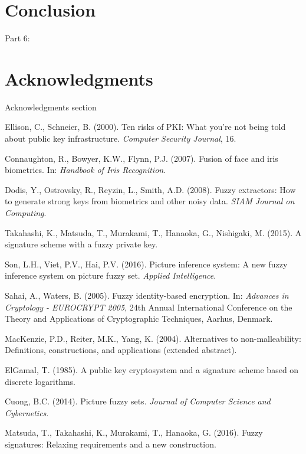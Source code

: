\documentclass[graybox]{svmult}
\begin{document}
\section{Conclusion}
Part 6:


\section*{Acknowledgments}
Acknowledgments section


\begin{thebibliography}{99}
     Ellison, C., Schneier, B. (2000). Ten risks of PKI: What you're not being told about public key infrastructure. \textit{Computer Security Journal}, 16.

     Connaughton, R., Bowyer, K.W., Flynn, P.J. (2007). Fusion of face and iris biometrics. In: \textit{Handbook of Iris Recognition}.

     Dodis, Y., Ostrovsky, R., Reyzin, L., Smith, A.D. (2008). Fuzzy extractors: How to generate strong keys from biometrics and other noisy data. \textit{SIAM Journal on Computing}.

     Takahashi, K., Matsuda, T., Murakami, T., Hanaoka, G., Nishigaki, M. (2015). A signature scheme with a fuzzy private key.

     Son, L.H., Viet, P.V., Hai, P.V. (2016). Picture inference system: A new fuzzy inference system on picture fuzzy set. \textit{Applied Intelligence}.

     Sahai, A., Waters, B. (2005). Fuzzy identity-based encryption. In: \textit{Advances in Cryptology - EUROCRYPT 2005}, 24th Annual International Conference on the Theory and Applications of Cryptographic Techniques, Aarhus, Denmark.

     MacKenzie, P.D., Reiter, M.K., Yang, K. (2004). Alternatives to non-malleability: Definitions, constructions, and applications (extended abstract).

     ElGamal, T. (1985). A public key cryptosystem and a signature scheme based on discrete logarithms.

     Cuong, B.C. (2014). Picture fuzzy sets. \textit{Journal of Computer Science and Cybernetics}.

     Matsuda, T., Takahashi, K., Murakami, T., Hanaoka, G. (2016). Fuzzy signatures: Relaxing requirements and a new construction.
\end{thebibliography}
\end{document}
